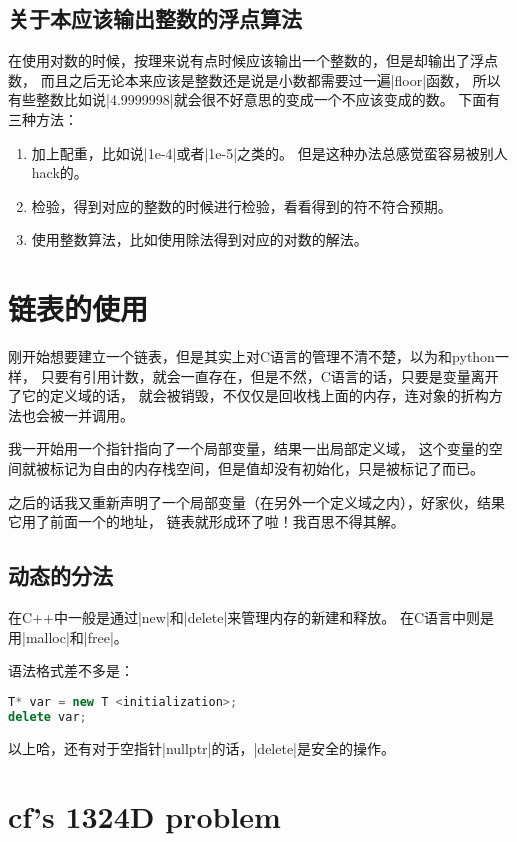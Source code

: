 \subsection{关于本应该输出整数的浮点算法}
在使用对数的时候，按理来说有点时候应该输出一个整数的，但是却输出了浮点数，
而且之后无论本来应该是整数还是说是小数都需要过一遍\vb|floor|函数，
所以有些整数比如说\vb|4.9999998|就会很不好意思的变成一个不应该变成的数。
下面有三种方法：

\begin{enumerate}
\item 加上配重，比如说\vb|1e-4|或者\vb|1e-5|之类的。
      但是这种办法总感觉蛮容易被别人hack的。
\item 检验，得到对应的整数的时候进行检验，看看得到的符不符合预期。
\item 使用整数算法，比如使用除法得到对应的对数的解法。
\end{enumerate}


\section{链表的使用}

刚开始想要建立一个链表，但是其实上对C语言的管理不清不楚，以为和python一样，
只要有引用计数，就会一直存在，但是不然，C语言的话，只要是变量离开了它的定义域的话，
就会被销毁，不仅仅是回收栈上面的内存，连对象的折构方法也会被一并调用。

我一开始用一个指针指向了一个局部变量，结果一出局部定义域，
这个变量的空间就被标记为自由的内存栈空间，但是值却没有初始化，只是被标记了而已。

之后的话我又重新声明了一个局部变量（在另外一个定义域之内），好家伙，结果它用了前面一个的地址，
链表就形成环了啦！我百思不得其解。

\subsection{动态的分法}
在C++中一般是通过\vb|new|和\vb|delete|来管理内存的新建和释放。
在C语言中则是用\vb|malloc|和\vb|free|。

语法格式差不多是：
\begin{lstlisting}[language=C++]
T* var = new T <initialization>;
delete var;
\end{lstlisting}

以上哈，还有对于空指针\vb|nullptr|的话，\vb|delete|是安全的操作。


\section{cf's 1324D problem}

